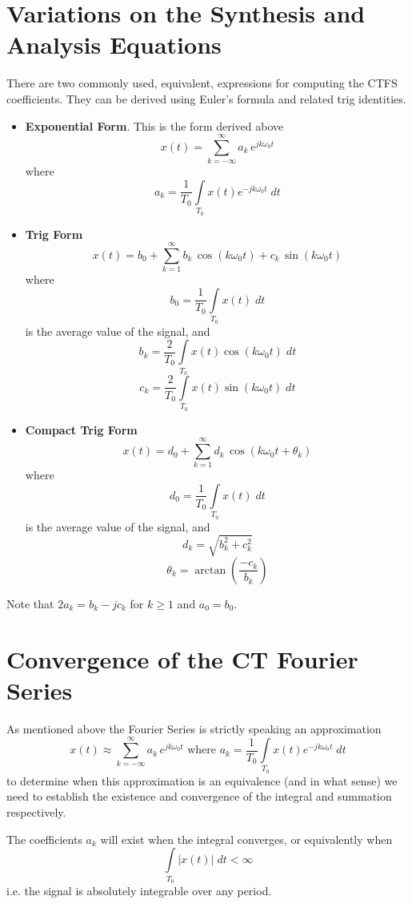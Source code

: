 \section{Variations on the Synthesis and Analysis Equations}
There are two commonly used, equivalent, expressions for computing the CTFS coefficients. They can be derived using Euler's formula and related trig identities.

\begin{itemize}
\item \textbf{Exponential Form}. This is the form derived above
  \[
  x(t) = \sum\limits_{k = -\infty}^{\infty} a_k \, e^{j k\omega_0 t}
  \]
  where 
  \[
  a_k = \frac{1}{T_0} \int\limits_{T_0} x(t)e^{-jk\omega_0 t} \; dt
  \]
\item \textbf{Trig Form}
  \[
  x(t) = b_0 + \sum\limits_{k = 1}^{\infty} b_k \,\cos(k\omega_0 t) + c_k\,\sin(k\omega_0 t) 
  \]
  where
  \[
  b_0 = \frac{1}{T_0} \int\limits_{T_0} x(t) \; dt
  \]
  is the average value of the signal, and
  \[
  b_k = \frac{2}{T_0} \int\limits_{T_0} x(t)\cos(k\omega_0 t) \; dt
  \]
  \[
  c_k = \frac{2}{T_0} \int\limits_{T_0} x(t)\sin(k\omega_0 t) \; dt
  \]
\item \textbf{Compact Trig Form}
  \[
  x(t) = d_0 + \sum\limits_{k = 1}^{\infty} d_k \,\cos(k\omega_0 t + \theta_k) 
  \]
  where
  \[
  d_0 = \frac{1}{T_0} \int\limits_{T_0} x(t) \; dt
  \]
  is the average value of the signal, and
  \[
  d_k = \sqrt{b_k^2 + c_k^2} 
  \]
  \[
  \theta_k = \arctan\left( \frac{-c_k}{b_k} \right)
  \]
\end{itemize}

Note that $2a_k = b_k -j c_k$ for $k \geq 1$ and $a_0=b_0$.

\section{Convergence of the CT Fourier Series}

As mentioned above the Fourier Series is strictly speaking an approximation
\[
x(t) \approx \sum\limits_{k = -\infty}^{\infty} a_k \, e^{j k\omega_0 t} \mbox{ where } a_k = \frac{1}{T_0} \int\limits_{T_0} x(t)e^{-jk\omega_0 t} \; dt
\]
to determine when this approximation is an equivalence (and in what sense) we need to establish the existence and convergence of the integral and summation respectively.

The coefficients $a_k$ will exist when the integral converges, or equivalently when
\[
\int\limits_{T_0} \left|x(t)\right| \; dt < \infty
\]
i.e. the signal is absolutely integrable over any period.

